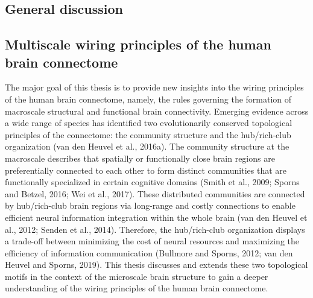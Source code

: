 \begin{refsection}
\section*{General discussion}
\subsection*{Multiscale wiring principles of the human brain connectome}
The major goal of this thesis is to provide new insights into the wiring principles of the human brain connectome, namely, the rules governing the formation of macroscale structural and functional brain connectivity. Emerging evidence across a wide range of species has identified two evolutionarily conserved topological principles of the connectome: the community structure and the hub/rich-club organization (van den Heuvel et al., 2016a). The community structure at the macroscale describes that spatially or functionally close brain regions are preferentially connected to each other to form distinct communities that are functionally specialized in certain cognitive domains (Smith et al., 2009; Sporns and Betzel, 2016; Wei et al., 2017). These distributed communities are connected by hub/rich-club brain regions via long-range and costly connections to enable efficient neural information integration within the whole brain (van den Heuvel et al., 2012; Senden et al., 2014). Therefore, the hub/rich-club organization displays a trade-off between minimizing the cost of neural resources and maximizing the efficiency of information communication (Bullmore and Sporns, 2012; van den Heuvel and Sporns, 2019). This thesis discusses and extends these two topological motifs in the context of the microscale brain structure to gain a deeper understanding of the wiring principles of the human brain connectome.


\end{refsection}
